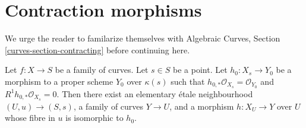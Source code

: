 \section{Contraction morphisms}
\label{section-contracting}

\noindent
We urge the reader to familarize themselves with
Algebraic Curves, Section \ref{curves-section-contracting}
before continuing here.

\begin{lemma}
\label{lemma-contract-basic}
Let $f : X \to S$ be a family of curves. Let $s \in S$ be a point.
Let $h_0 : X_s \to Y_0$ be a morphism to a proper scheme $Y_0$ over $\kappa(s)$
such that $h_{0, *}\mathcal{O}_{X_s} = \mathcal{O}_{Y_0}$ and
$R^1h_{0, *}\mathcal{O}_{X_s} = 0$. Then there exist an elementary
\'etale neighbourhood $(U, u) \to (S, s)$, a family of curves $Y \to U$,
and a morphism $h : X_U \to Y$ over $U$ whose fibre in $u$
is isomorphic to $h_0$.
\end{lemma}

